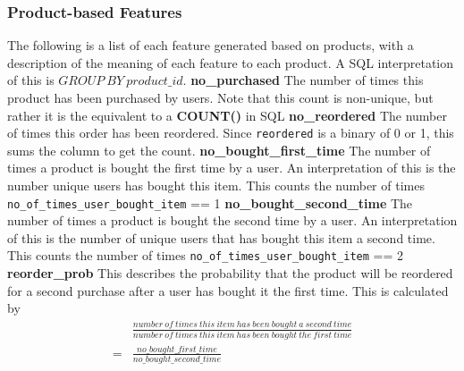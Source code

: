 \documentclass[12pt]{article}
\begin{document}
\subsubsection{Product-based Features}
The following is a list of each feature generated based on products, with a description of the meaning of each feature to each product. A SQL interpretation of this is $GROUP\ BY\ product\_id$.
\newline\newline
{\textbf{no\_purchased}}
\newline
The number of times this product has been purchased by users. Note that this count is non-unique, but rather it is the equivalent to a \textbf{COUNT()} in SQL
\newline\newline
{\textbf{no\_reordered}}
\newline
The number of times this order has been reordered. Since \texttt{reordered} is a binary of 0 or 1, this sums the column to get the count.
\newline\newline
{\textbf{no\_bought\_first\_time}}
\newline
The number of times a product is bought the first time by a user. An interpretation of this is the number unique users has bought this item. This counts the number of times \texttt{no\_of\_times\_user\_bought\_item} == 1
\newline\newline
{\textbf{no\_bought\_second\_time}}
\newline
The number of times a product is bought the second time by a user. An interpretation of this is the number of unique users that has bought this item a second time. This counts the number of times \texttt{no\_of\_times\_user\_bought\_item} == 2
\newline\newline
{\textbf{reorder\_prob}}
\newline
This describes the probability that the product will be reordered for a second purchase after a user has bought it the first time. This is calculated by
\begin{equation}
    \begin{split}
        &\frac
        {number\ of\ times\ this\ item\ has\ been\ bought\ a\ second\ time}
        {number\ of\ times\ this\ item\ has\ been\ bought\ the\ first\ time}\\
        = &\frac
        {no\_bought\_first\_time}
        {no\_bought\_second\_time}
    \end{split}
\end{equation}
\end{document}
